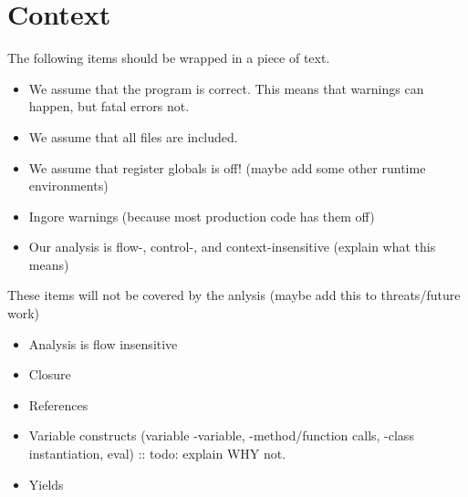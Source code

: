 \documentclass[../main.tex]{subfiles}
\begin{document}
    \section{Context}
    The following items should be wrapped in a piece of text.
    \begin{itemize}
        \item We assume that the program is correct. This means that warnings can happen, but fatal errors not.
        \item We assume that all files are included.
        \item We assume that register globals is off! (maybe add some other runtime environments)
        \item Ingore warnings (because most production code has them off)
        \item Our analysis is flow-, control-, and context-insensitive (explain what this means)
    \end{itemize}
    These items will not be covered by the anlysis (maybe add this to threats/future work)
    \begin{itemize}
        \item Analysis is flow insensitive
        \item Closure
        \item References
        \item Variable constructs (variable -variable, -method/function calls, -class instantiation, eval) :: todo: explain WHY not.
        \item Yields
        
    \end{itemize}
\end{document}
